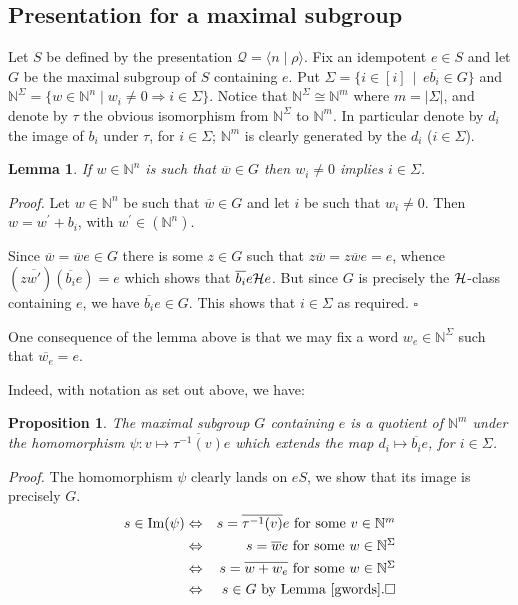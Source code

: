 \documentclass[12pt]{article}
\newtheorem{lemma}{Lemma}
\newtheorem{proposition}{\qquad\bf Proposition}
\begin{document}
\subsection{Presentation for a maximal subgroup}\label{s:maxsubgrp}

Let $S$ be defined by the presentation 
${\mathcal Q}=\langle n\mid \rho\rangle$.
Fix an idempotent $e\in S$ and let $G$ be the maximal subgroup
of $S$ containing $e$. Put  $\Sigma=\{i\in [i]\,\mid\,e\overline{b_i}\in G\}$
and $\mathbb{N}^{\Sigma}=\{w\in\mathbb{N}^n\mid w_i\neq 0\Rightarrow i
\in\Sigma\}$. Notice that $\mathbb{N}^{\Sigma}\cong\mathbb{N}^m$
where $m=|\Sigma|$, and denote by $\tau$ the obvious
isomorphism from $\mathbb{N}^{\Sigma}$ to $\mathbb{N}^m$.
In particular denote by $d_i$ the image of $b_i$ under $\tau$,
for $i\in\Sigma$; $\mathbb{N}^m$ is clearly generated by the $d_i$
($i\in\Sigma$).

\begin{lemma}\label{gwords}
If $w\in \mathbb{N}^n$ is such that $\overline{w}\in G$ then
$w_i \neq 0$ implies $i\in\Sigma$.
\end{lemma}
\emph{Proof.}
Let $w\in \mathbb{N}^n$ be such that $\overline{w}\in G$ and let $i$ be 
such that $w_i\neq 0$. Then $w=w^{\prime}+b_i$, with $w^{\prime}\in
(\mathbb{N}^n)$.

Since $\overline{w} = \overline{w}e \in G$  there is some
$z \in G$ such that $z \overline{w} = z \overline{w} e = e$,
whence $(z \overline{w'}) (\overline{b_i} e) = e$ which shows that
$\overline{b_i} e {\cal H} e$. But since $G$ is precisely the 
${\cal H}$-class containing $e$, we have $\overline{b_i}e \in G$.    
This shows that $i \in \Sigma$ as required.  $\square$

One consequence of the lemma above is that we may fix a 
word $w_e\in\mathbb{N}^{\Sigma}$ such that $\overline{w_e}=e$. 

Indeed, with notation as set out above, we have:

\begin{proposition}\label{p:ggens}
The maximal subgroup $G$ containing $e$ is a quotient of 
$\mathbb{N}^m$ under the homomorphism
$\psi: v \mapsto \overline{\tau^{-1}(v)}e$ which extends the map
$d_i \mapsto \overline{b_i} e$, for $i \in \Sigma$.
\end{proposition}
\emph{Proof.}
The homomorphism $\psi$ clearly lands on $eS$, we show that
its image is precisely $G$.
\begin{eqnarray*}
s \in \mbox{Im}(\psi) & \Leftrightarrow & s = \overline{\tau^{-1}(v)}e \mbox{
for some $v \in \mathbb{N}^m$} \\
&\Leftrightarrow & s = \overline{w}e \mbox{ for some $w \in
\mathbb{N}^\Sigma$}\\
&\Leftrightarrow & s = \overline{w + w_e} \mbox{ for some $w \in
\mathbb{N}^\Sigma$}\\
&\Leftrightarrow & s \in G \mbox{ by Lemma \ref{gwords}.}\square
\end{eqnarray*}
\end{document}
